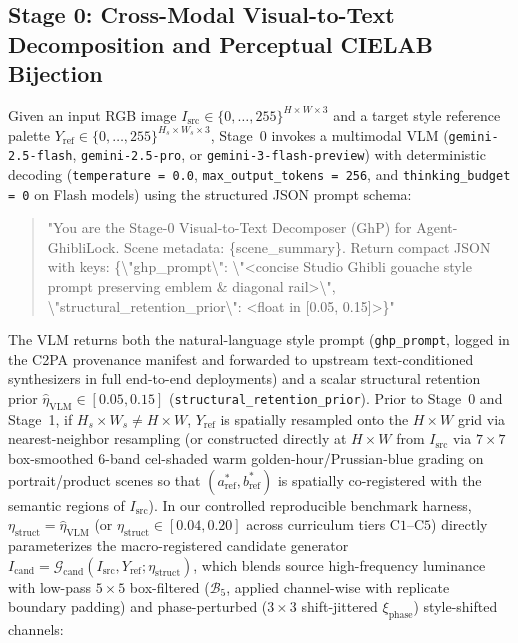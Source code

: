 \documentclass[conference,10pt]{IEEEtran}
\begin{document}
\subsection{Stage 0: Cross-Modal Visual-to-Text Decomposition and Perceptual CIELAB Bijection}
Given an input RGB image $I_{\text{src}} \in \{0, \dots, 255\}^{H \times W \times 3}$ and a target style reference palette $Y_{\text{ref}} \in \{0, \dots, 255\}^{H_s \times W_s \times 3}$, Stage~0 invokes a multimodal VLM (\texttt{gemini-2.5-flash}, \texttt{gemini-2.5-pro}, or \texttt{gemini-3-flash-preview}) with deterministic decoding (\texttt{temperature = 0.0}, \texttt{max\_output\_tokens = 256}, and \texttt{thinking\_budget = 0} on Flash models) using the structured JSON prompt schema:
\begin{quote}
\small\ttfamily
"You are the Stage-0 Visual-to-Text Decomposer (GhP) for Agent-GhibliLock. Scene metadata: \{scene\_summary\}. Return compact JSON with keys: \{\textbackslash"ghp\_prompt\textbackslash": \textbackslash"<concise Studio Ghibli gouache style prompt preserving emblem \& diagonal rail>\textbackslash", \textbackslash"structural\_retention\_prior\textbackslash": <float in [0.05, 0.15]>\}"
\end{quote}
The VLM returns both the natural-language style prompt (\texttt{ghp\_prompt}, logged in the C2PA provenance manifest and forwarded to upstream text-conditioned synthesizers in full end-to-end deployments) and a scalar structural retention prior $\hat{\eta}_{\text{VLM}} \in [0.05, 0.15]$ (\texttt{structural\_retention\_prior}). Prior to Stage~0 and Stage~1, if $H_s \times W_s \ne H \times W$, $Y_{\text{ref}}$ is spatially resampled onto the $H \times W$ grid via nearest-neighbor resampling (or constructed directly at $H \times W$ from $I_{\text{src}}$ via $7\times 7$ box-smoothed 6-band cel-shaded warm golden-hour/Prussian-blue grading on portrait/product scenes so that $(a^*_{\text{ref}}, b^*_{\text{ref}})$ is spatially co-registered with the semantic regions of $I_{\text{src}}$). In our controlled reproducible benchmark harness, $\eta_{\text{struct}} = \hat{\eta}_{\text{VLM}}$ (or $\eta_{\text{struct}} \in [0.04, 0.20]$ across curriculum tiers $\text{C1}\text{--}\text{C5}$) directly parameterizes the macro-registered candidate generator $I_{\text{cand}} = \mathcal{G}_{\text{cand}}(I_{\text{src}}, Y_{\text{ref}}; \eta_{\text{struct}})$, which blends source high-frequency luminance with low-pass $5\times 5$ box-filtered ($\mathcal{B}_5$, applied channel-wise with replicate boundary padding) and phase-perturbed ($3\times 3$ shift-jittered $\xi_{\text{phase}}$) style-shifted channels:
\end{document}
